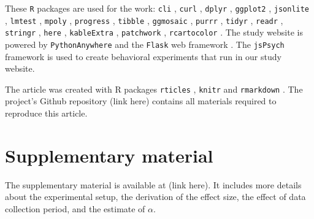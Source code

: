\documentclass[]{interact}
\theoremstyle{plain}%
\theoremstyle{definition}
\theoremstyle{remark}
\begin{document}
These \texttt{R} packages are used for the work: \texttt{cli}
\citep{cli}, \texttt{curl} \citep{curl}, \texttt{dplyr} \citep{dplyr},
\texttt{ggplot2} \citep{ggplot2}, \texttt{jsonlite} \citep{jsonlite},
\texttt{lmtest} \citep{lmtest}, \texttt{mpoly} \citep{mpoly},
\texttt{progress} \citep{progress}, \texttt{tibble} \citep{tibble},
\texttt{ggmosaic} \citep{ggmosaic}, \texttt{purrr} \citep{purrr},
\texttt{tidyr} \citep{tidyr}, \texttt{readr} \citep{readr},
\texttt{stringr} \citep{stringr}, \texttt{here} \citep{here},
\texttt{kableExtra} \citep{kableextra}, \texttt{patchwork}
\citep{patchwork}, \texttt{rcartocolor} \citep{rcartocolor}. The study
website is powered by \texttt{PythonAnywhere} \citep{pythonanywhere} and
the \texttt{Flask} web framework \citep{flask}. The \texttt{jsPsych}
framework \citep{jspsych} is used to create behavioral experiments that
run in our study website.

The article was created with R packages \texttt{rticles}
\citep{rticles}, \texttt{knitr} \citep{knitr} and \texttt{rmarkdown}
\citep{rmarkdown}. The project's Github repository (link here) contains
all materials required to reproduce this article.

\hypertarget{supplementary-material}{%
\section*{Supplementary material}\label{supplementary-material}}

The supplementary material is available at (link here). It includes more
details about the experimental setup, the derivation of the effect size,
the effect of data collection period, and the estimate of \(\alpha\).



\end{document}
